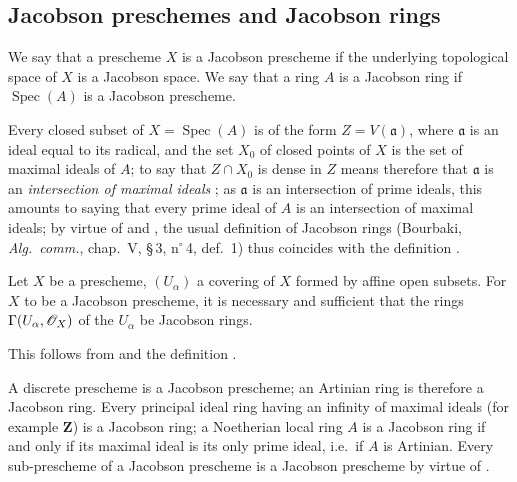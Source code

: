 \subsection{Jacobson preschemes and Jacobson rings}
\label{subsection:IV.10.4}

\begin{definition}[10.4.1]
\label{IV.10.4.1}
We say that a prescheme $X$ is a Jacobson prescheme if the underlying topological space of $X$ is a Jacobson space.
We say that a ring $A$ is a Jacobson ring if $\operatorname{Spec}(A)$ is a Jacobson prescheme.
\end{definition}

Every closed subset of $X=\operatorname{Spec}(A)$ is of the form $Z=V(\mathfrak{a})$, where $\mathfrak{a}$ is an ideal equal to its radical, and the set $X_0$ of closed points of $X$ is the set of maximal ideals of $A$; to say that $Z\cap X_0$ is dense in $Z$ means therefore that $\mathfrak{a}$ is an \emph{intersection of maximal ideals} ; as $\mathfrak{a}$ is an intersection of prime ideals, this amounts to saying that every prime ideal of $A$ is an intersection of maximal ideals; by virtue of  and , the usual definition of Jacobson rings (Bourbaki, \emph{Alg.\ comm.}, chap.~V, \S\,3, n$^\circ$\,4, def.~1) thus coincides with the definition .

\begin{proposition}[10.4.2]
\label{IV.10.4.2}
Let $X$ be a prescheme, $(U_\alpha)$ a covering of $X$ formed by affine open subsets.
For $X$ to be a Jacobson prescheme, it is necessary and sufficient that the rings $\Gamma(U_\alpha,\mathscr{O}_X)$ of the $U_\alpha$ be Jacobson rings.
\end{proposition}

This follows from  and the definition .

\begin{env}[10.4.3]
\label{IV.10.4.3}
A discrete prescheme is a Jacobson prescheme; an Artinian ring is therefore a Jacobson ring.
Every principal ideal ring having an infinity of maximal ideals (for example $\mathbf{Z}$) is a Jacobson ring; a Noetherian local ring $A$ is a Jacobson ring if and only if its maximal ideal is its only prime ideal, i.e.\ if $A$ is Artinian.
Every sub-prescheme of a Jacobson prescheme is a Jacobson prescheme by virtue of .
\end{env}

